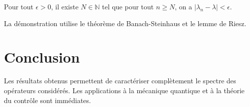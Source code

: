 \documentclass{article}
\begin{document}
\begin{theorem}
Pour tout $\epsilon > 0$, il existe $N \in \mathbb{N}$ tel que pour tout $n \ge N$,
on a $|\lambda_n - \lambda| < \epsilon$.
\end{theorem}

La d\'emonstration utilise le th\'eor\`eme de Banach-Steinhaus et le lemme de Riesz.

\section{Conclusion}

Les r\'esultats obtenus permettent de caract\'eriser compl\`etement le spectre des
op\'erateurs consid\'er\'es.  Les applications \`a la m\'ecanique quantique et \`a
la th\'eorie du contr\^ole sont imm\'ediates.
\end{document}
